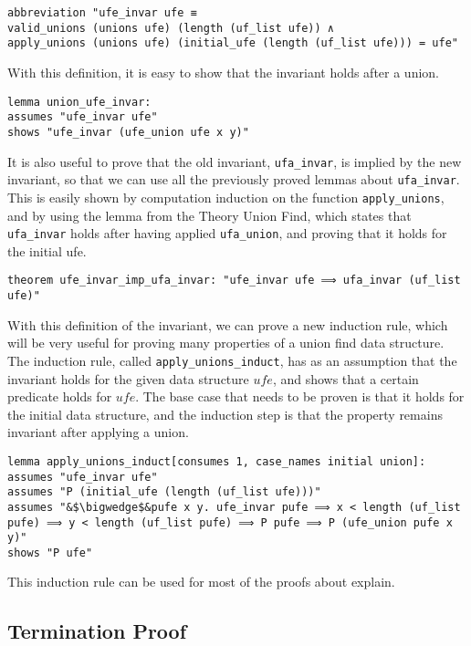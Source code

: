 \begin{lstlisting}
abbreviation "ufe_invar ufe ≡
valid_unions (unions ufe) (length (uf_list ufe)) ∧
apply_unions (unions ufe) (initial_ufe (length (uf_list ufe))) = ufe"
\end{lstlisting}

With this definition, it is easy to show that the invariant holds after a union.

\begin{lstlisting}
lemma union_ufe_invar:
assumes "ufe_invar ufe"
shows "ufe_invar (ufe_union ufe x y)"
\end{lstlisting}

It is also useful to prove that the old invariant, \lstinline{ufa_invar}, is implied by the new invariant, so that we can use all the previously proved lemmas about \lstinline{ufa_invar}. This is easily shown by computation induction on the function \lstinline{apply_unions}, and by using the lemma from the Theory Union Find\cite{Sep}, which states that \lstinline{ufa_invar} holds after having applied \lstinline{ufa_union}, and proving that it holds for the initial ufe.

\begin{lstlisting}
theorem ufe_invar_imp_ufa_invar: "ufe_invar ufe ⟹ ufa_invar (uf_list ufe)"
\end{lstlisting}

With this definition of the invariant, we can prove a new induction rule, which will be very useful for proving many properties of a union find data structure. The induction rule, called \lstinline{apply_unions_induct}, has as an assumption that the invariant holds for the given data structure $ufe$, and shows that a certain predicate holds for $ufe$. The base case that needs to be proven is that it holds for the initial data structure, and the induction step is that the property remains invariant after applying a union.

\begin{lstlisting}
lemma apply_unions_induct[consumes 1, case_names initial union]:
assumes "ufe_invar ufe"
assumes "P (initial_ufe (length (uf_list ufe)))"
assumes "&$\bigwedge$&pufe x y. ufe_invar pufe ⟹ x < length (uf_list pufe) ⟹ y < length (uf_list pufe) ⟹ P pufe ⟹ P (ufe_union pufe x y)"
shows "P ufe"
\end{lstlisting}

This induction rule can be used for most of the proofs about explain.

\subsection{Termination Proof}
\label{subsection:termination}

